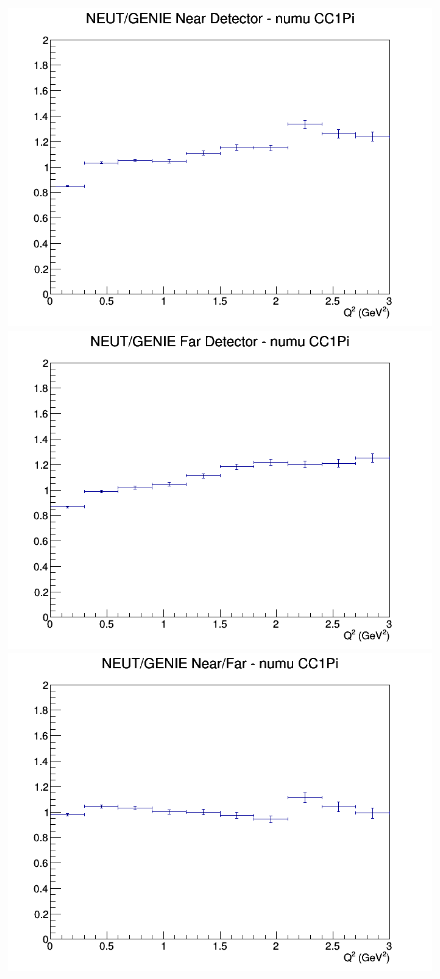 \documentclass[12pt]{article}
\begin{document}
\begin{figure}[h]
\endminipage
\newline
{}
\includegraphics[width=\linewidth]{eff_Q2/GAr/ratios/CC1Pi_NEUT_GENIE_numu_near_Q2.png}
\endminipage
{}
\includegraphics[width=\linewidth]{eff_Q2/GAr/ratios/CC1Pi_NEUT_GENIE_numu_far_Q2.png}
\endminipage
{}
\includegraphics[width=\linewidth]{eff_Q2/GAr/ratios/CC1Pi_NEUT_GENIE_numu_NF_Q2.png}

\end{figure}
\end{document}

